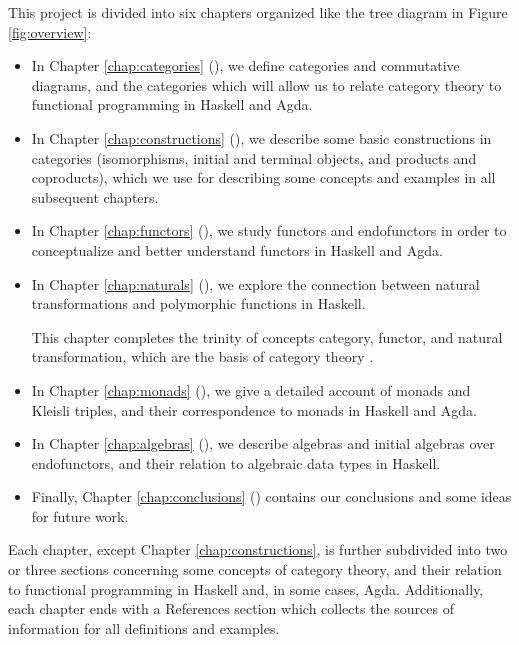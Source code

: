 This project is divided into six chapters organized like the tree
diagram in Figure \ref{fig:overview}:
\begin{itemize}
\item
  In Chapter \ref{chap:categories} (), we
  define categories and commutative diagrams, and the categories which
  will allow us to relate category theory to functional programming in
  Haskell and Agda.

\item
  In Chapter \ref{chap:constructions} (),
  we describe some basic constructions in categories (isomorphisms,
  initial and terminal objects, and products and coproducts), which we
  use for describing some concepts and examples in all subsequent
  chapters.

\item
  In Chapter \ref{chap:functors} (), we study
  functors and endofunctors in order to conceptualize and better
  understand functors in Haskell and Agda.

\item
  In Chapter \ref{chap:naturals} (), we explore
  the connection between natural transformations and polymorphic
  functions in Haskell.

  This chapter completes the trinity of concepts category, functor,
  and natural transformation, which are the basis of category theory
  \parencite{nlab-category-theory}.

\item
  In Chapter \ref{chap:monads} (), we give a
  detailed account of monads and Kleisli triples, and their
  correspondence to monads in Haskell and Agda.

\item
  In Chapter \ref{chap:algebras} (), we
  describe algebras and initial algebras over endofunctors, and their
  relation to algebraic data types in Haskell.

\item
  Finally, Chapter \ref{chap:conclusions} ()
  contains our conclusions and some ideas for future work.

\end{itemize}

Each chapter, except Chapter \ref{chap:constructions}, is further
subdivided into two or three sections concerning some concepts of
category theory, and their relation to functional programming in
Haskell and, in some cases, Agda. Additionally, each chapter ends with
a References section which collects the sources of information for all
definitions and examples.

